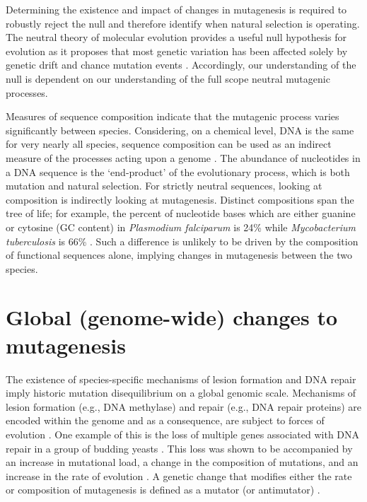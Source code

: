 Determining the existence and impact of changes in mutagenesis is required to robustly reject the null and therefore identify when natural selection is operating. The neutral theory of molecular evolution provides a useful null hypothesis for evolution as it proposes that most genetic variation has been affected solely by genetic drift and chance mutation events \citep{Kimura1968EvolutionaryLevel, King1969Non-DarwinianEvolution}. Accordingly, our understanding of the null is dependent on our understanding of the full scope neutral mutagenic processes. 

Measures of sequence composition indicate that the mutagenic process varies significantly between species. Considering, on a chemical level, DNA is the same for very nearly all species, sequence composition can be used as an indirect measure of the processes acting upon a genome \citep{Karlin1994ComparisonsSequences, Karlin1995DinucleotideSignature}. The abundance of nucleotides in a DNA sequence is the `end-product' of the evolutionary process, which is both mutation and natural selection. For strictly neutral sequences, looking at composition is indirectly looking at mutagenesis. Distinct compositions span the tree of life; for example, the percent of nucleotide bases which are either guanine or cytosine (GC content) in \textit{Plasmodium falciparum} is 24\% while \textit{Mycobacterium tuberculosis} is  66\% \citep{Nakamura2000Codon2000}. Such a difference is unlikely to be driven by the composition of functional sequences alone, implying changes in mutagenesis between the two species. 

\section{Global (genome-wide) changes to mutagenesis}

The existence of species-specific mechanisms of lesion formation \citep{Moore2012DNAFunction} and DNA repair \citep{Kelner1949EffectInjury} imply historic mutation disequilibrium on a global genomic scale. Mechanisms of lesion formation (e.g., DNA methylase) and repair (e.g., DNA repair proteins) are encoded within the genome and as a consequence, are subject to forces of evolution \citep{Lynch2010EvolutionRate, Lynch2016GeneticRate}. One example of this is the loss of multiple genes associated with DNA repair in a group of budding yeasts \citep{Steenwyk2019ExtensiveYeasts}. This loss was shown to be accompanied by an increase in mutational load, a change in the composition of mutations, and an increase in the rate of evolution \citep{Steenwyk2019ExtensiveYeasts}. A genetic change that modifies either the rate or composition of mutagenesis is defined as a mutator (or antimutator) \citep{Lynch2016GeneticRate}. 


